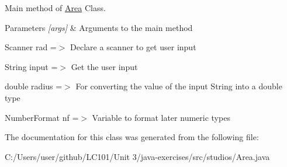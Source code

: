 Main method of \mbox{\hyperlink{classstudios_1_1_area}{Area}} Class. 
\begin{DoxyParams}{Parameters}
{\em \mbox{[}args\mbox{]}} & Arguments to the main method \\
\hline
\end{DoxyParams}
Scanner rad =$>$ Declare a scanner to get user input

String input =$>$ Get the user input

double radius =$>$ For converting the value of the input String into a double type

Number\+Format nf =$>$ Variable to format later numeric types 

The documentation for this class was generated from the following file\+:\begin{DoxyCompactItemize}
\item 
C\+:/\+Users/user/github/\+L\+C101/\+Unit 3/java-\/exercises/src/studios/Area.\+java\end{DoxyCompactItemize}
